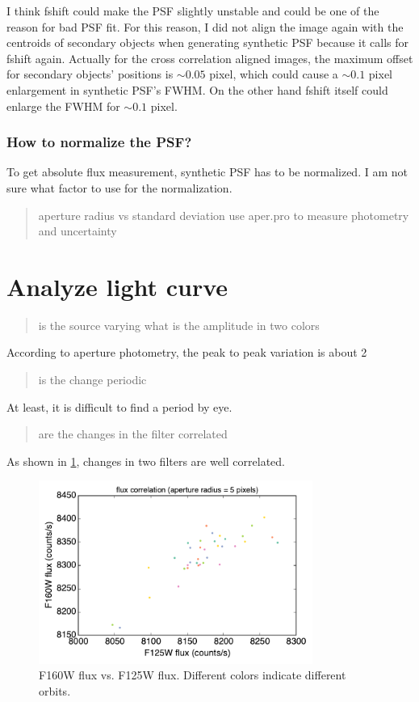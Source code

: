 \documentclass[paper=letter, fontsize=11pt]{scrartcl} %
\numberwithin{equation}{section} %
\numberwithin{figure}{section} %
\numberwithin{table}{section} %
\begin{document}
I think fshift could make the PSF slightly unstable and could be one
of the reason for bad PSF fit. For this reason, I did not align the
image again with the centroids of secondary objects when generating
synthetic PSF because it calls
for fshift again. Actually for the cross correlation aligned images,
the maximum offset for secondary objects' positions is $\sim0.05$ pixel,
which could cause a $\sim0.1$ pixel enlargement in synthetic PSF's FWHM. On the
other hand fshift itself could enlarge the FWHM for $\sim0.1$ pixel.

\subsubsection{How to normalize the PSF? }
To get absolute flux measurement, synthetic PSF has to be
normalized. I am not sure what factor to use for the normalization.


\begin{quote}
aperture radius vs standard deviation
use aper.pro  to measure photometry and uncertainty
\end{quote}


\section{Analyze light curve}
\begin{quote}
 is the source varying
 what is the amplitude in two colors
\end{quote}

According to aperture photometry, the peak to peak variation is about
2%

\begin{quote}
  is the change periodic
\end{quote}

At least, it is difficult to find a period by eye.

\begin{quote}
  are the changes in the filter correlated
\end{quote}
As shown in \ref{fig:corr}, changes in two filters are well correlated.
\begin{figure}
  \centering
  \includegraphics[width=0.8\textwidth]{Flux_correlation_Nov17}
  \caption{F160W flux vs. F125W flux. Different colors indicate
    different orbits.}
  \label{fig:corr}
\end{figure}
\end{document}
